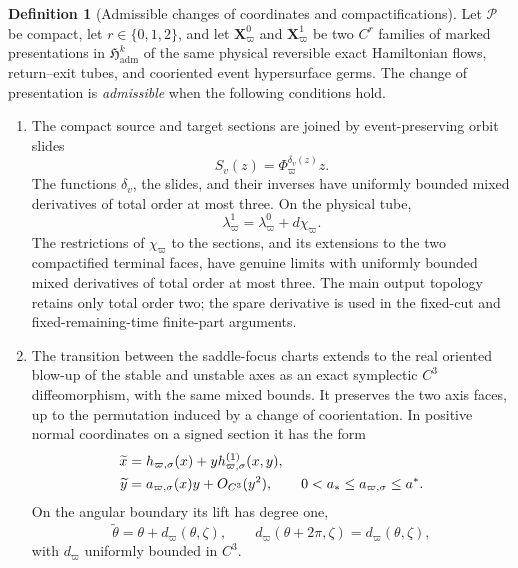 \documentclass[11pt]{amsart}
\numberwithin{equation}{section}
\theoremstyle{definition}
\newtheorem{definition}[theorem]{Definition}
\theoremstyle{remark}
\begin{document}
\begin{definition}[Admissible changes of coordinates and compactifications]
\label{def:compatible-marking-change}
Let $\mathcal P$ be compact, let $r\in\{0,1,2\}$, and let
$\mathbf X_\varpi^0$ and $\mathbf X_\varpi^1$ be two $C^r$ families of
marked presentations in $\mathfrak H_{\mathrm{adm}}^k$ of the same physical reversible exact
Hamiltonian flows, return--exit tubes, and cooriented event hypersurface
germs.  The change of presentation is \emph{admissible} when the following
conditions hold.
\begin{enumerate}
\renewcommand{\labelenumi}{\textup{(\alph{enumi})}}
\item The compact source and target sections are joined by
event-preserving orbit slides
\begin{equation}\label{eq:compatible-orbit-slides}
 S_v(z)=\Phi_\varpi^{\delta_v(z)}z .
\end{equation}
The functions $\delta_v$, the slides, and their inverses have uniformly
bounded mixed derivatives of total order at most three.  On the physical
tube,
\begin{equation}\label{eq:compatible-exact-gauge}
 \lambda_\varpi^1=\lambda_\varpi^0+d\chi_\varpi.
\end{equation}
The restrictions of $\chi_\varpi$ to the sections, and its extensions to
the two compactified terminal faces, have genuine limits with uniformly
bounded mixed derivatives of total order at most three.  The main output
topology retains only total order two; the spare derivative is used in the
fixed-cut and fixed-remaining-time finite-part arguments.

\item The transition between the saddle-focus charts extends to the real
oriented blow-up of the stable and unstable axes as an exact symplectic
$C^3$ diffeomorphism, with the same mixed bounds.  It preserves the two
axis faces, up to the permutation induced by a change of coorientation.
In positive normal coordinates on a signed section it has the form
\begin{align}
 \widetilde x&=h_{\varpi,\sigma}(x)
       +y h_{\varpi,\sigma}^{(1)}(x,y),\notag\\
 \widetilde y&=a_{\varpi,\sigma}(x)y+O_{C^3}(y^2),
 \qquad 0<a_*\le a_{\varpi,\sigma}\le a^*.
 \label{eq:compatible-seam-transition}
\end{align}
On the angular boundary its lift has degree one,
\begin{equation}\label{eq:compatible-angular-transition}
 \widetilde\theta=\theta+d_\varpi(\theta,\zeta),\qquad
 d_\varpi(\theta+2\pi,\zeta)=d_\varpi(\theta,\zeta),
\end{equation}
with $d_\varpi$ uniformly bounded in $C^3$.


\end{enumerate}
\end{definition}
\end{document}
